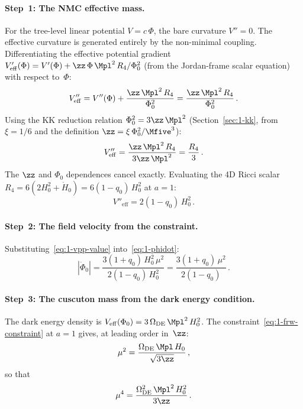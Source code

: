 \paragraph{Step~1: The NMC effective mass.} For the tree-level linear potential $V = c\,\Phi$, the bare curvature $V'' = 0$. The effective curvature is generated entirely by the non-minimal coupling. Differentiating the effective potential gradient $V'_{\mathrm{eff}}(\Phi) = V'(\Phi) + \zz\, \Phi\, \Mpl^2\, R_4/\Phi_0^2$ (from the Jordan-frame scalar equation) with respect to~$\Phi$:
\begin{equation}
\label{eq:1-vpp-eff}
V''_{\mathrm{eff}} = V''(\Phi) + \frac{\zz\,\Mpl^2\, R_4}{\Phi_0^2} = \frac{\zz\,\Mpl^2\, R_4}{\Phi_0^2}\,.
\end{equation}
Using the KK reduction relation $\Phi_0^2 = 3\zz\,\Mpl^2$ (Section~\ref{sec:1-kk}, from $\xi = 1/6$ and the definition $\zz = \xi\,\Phi_0^2/\Mfive^3$):
\begin{equation}
\label{eq:1-vpp-simplified}
V''_{\mathrm{eff}} = \frac{\zz\,\Mpl^2\, R_4}{3\zz\,\Mpl^2} = \frac{R_4}{3}\,.
\end{equation}
The $\zz$ and $\Phi_0$ dependences cancel exactly. Evaluating the 4D Ricci scalar $R_4 = 6(2H_0^2 + \dot{H}_0) = 6(1 - q_0)\, H_0^2$ at $a = 1$:
\begin{equation}
\label{eq:1-vpp-value}
V''_{\mathrm{eff}} = 2(1 - q_0)\, H_0^2\,.
\end{equation}

\paragraph{Step~2: The field velocity from the constraint.} Substituting~\eqref{eq:1-vpp-value} into~\eqref{eq:1-phidot}:
\begin{equation}
\label{eq:1-phidot-value}
|\dot\Phi_0| = \frac{3(1+q_0)\, H_0^2\, \mu^2}{2(1 - q_0)\, H_0^2} = \frac{3(1+q_0)\,\mu^2}{2(1 - q_0)}\,.
\end{equation}

\paragraph{Step~3: The cuscuton mass from the dark energy condition.} The dark energy density is $V_{\mathrm{eff}}(\Phi_0) = 3\,\Omega_{\mathrm{DE}}\, \Mpl^2\, H_0^2$. The constraint~\eqref{eq:1-frw-constraint} at $a = 1$ gives, at leading order in~$\zz$:
\begin{equation}
\label{eq:1-mu-de}
\mu^2 = \frac{\Omega_{\mathrm{DE}}\, \Mpl\, H_0}{\sqrt{3\zz}}\,,
\end{equation}
so that
\begin{equation}
\label{eq:1-mu4}
\mu^4 = \frac{\Omega_{\mathrm{DE}}^2\, \Mpl^2\, H_0^2}{3\zz}\,.
\end{equation}


